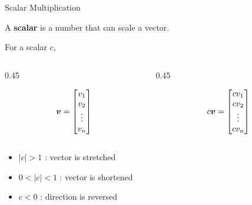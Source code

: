 \begin{frame}{Scalar Multiplication}

A \textbf{scalar} is a number that can scale a vector.

For a scalar $c$,

\begin{columns}[c,totalwidth=\textwidth]

\begin{column}{0.45\textwidth}

\begin{center}

\[
\bm{v}
=
\begin{bmatrix}
v_1\\
v_2\\
\vdots\\
v_n
\end{bmatrix}
\]

\end{center}

\end{column}

\begin{column}{0.45\textwidth}

\begin{center}

\[
c\bm{v}
=
\begin{bmatrix}
cv_1\\
cv_2\\
\vdots\\
cv_n
\end{bmatrix}
\]

\end{center}

\end{column}

\end{columns}

\vspace{0.4cm}

\begin{itemize}
    \item $|c|>1$   : vector is stretched
    \item $0<|c|<1$ : vector is shortened
    \item $c<0$     : direction is reversed
\end{itemize}

\end{frame}



